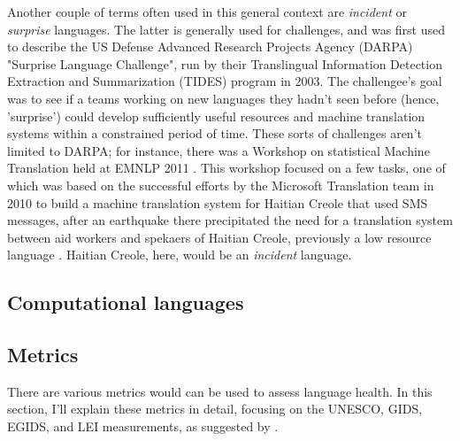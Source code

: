 Another couple of terms often used in this general context are \textit{incident} or \textit{surprise} languages. The latter is generally used for challenges, and was first used to describe the US Defense Advanced Research Projects Agency (DARPA) "Surprise Language Challenge", run by their Translingual Information Detection Extraction and Summarization (TIDES) program in 2003. The challengee's goal was to see if a teams working on new languages they hadn't seen before (hence, 'surprise') could develop sufficiently useful resources and machine translation systems within a constrained period of time. \citep{oard2003surprise} These sorts of challenges aren't limited to DARPA; for instance, there was a Workshop on statistical Machine Translation held  at  EMNLP  2011 \citep{callison2011findings}. This workshop focused on a few tasks, one of which was based on the successful efforts by the Microsoft Translation team in 2010 to build a machine translation system for Haitian Creole that used SMS messages, after an earthquake there precipitated the need for a translation system between aid workers and spekaers of Haitian Creole, previously a low resource language \citep{lewis2010haitian, lewis2011crisis}. Haitian Creole, here, would be an \textit{incident} language.

\subsection{Computational languages}


\subsection{Metrics}
\label{subsec:metrics}

There are various metrics would can be used to assess language health. In this section, I'll explain these metrics in detail, focusing on the UNESCO, GIDS, EGIDS, and LEI measurements, as suggested by \citet{yang2017toward}.



